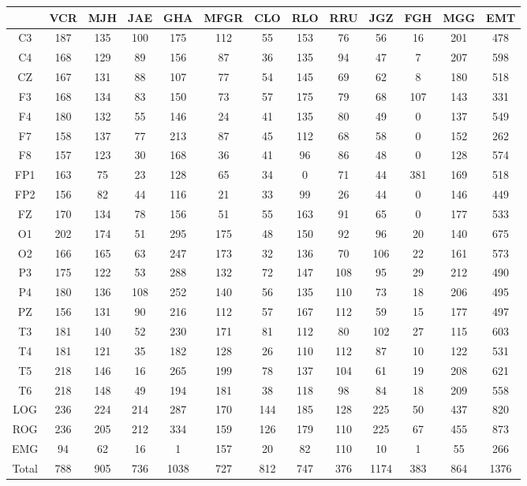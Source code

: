\begin{SidewaysFigure}
\centering
\begin{tabular}{c|ccccc|cccc|ccc}
& VCR & MJH & JAE & GHA & MFGR
& CLO & RLO & RRU & JGZ
& FGH & MGG & EMT \\
\hline
C3&187&135&100&175&112&55&153&76&56&16&201&478 \\
C4&168&129&89&156&87&36&135&94&47&7&207&598 \\
CZ&167&131&88&107&77&54&145&69&62&8&180&518 \\
F3&168&134&83&150&73&57&175&79&68&107&143&331 \\
F4&180&132&55&146&24&41&135&80&49&0&137&549 \\
F7&158&137&77&213&87&45&112&68&58&0&152&262 \\
F8&157&123&30&168&36&41&96&86&48&0&128&574 \\
FP1&163&75&23&128&65&34&0&71&44&381&169&518 \\
FP2&156&82&44&116&21&33&99&26&44&0&146&449 \\
FZ&170&134&78&156&51&55&163&91&65&0&177&533 \\
O1&202&174&51&295&175&48&150&92&96&20&140&675 \\
O2&166&165&63&247&173&32&136&70&106&22&161&573 \\
P3&175&122&53&288&132&72&147&108&95&29&212&490 \\
P4&180&136&108&252&140&56&135&110&73&18&206&495 \\
PZ&156&131&90&216&112&57&167&112&59&15&177&497 \\
T3&181&140&52&230&171&81&112&80&102&27&115&603 \\
T4&181&121&35&182&128&26&110&112&87&10&122&531 \\
T5&218&146&16&265&199&78&137&104&61&19&208&621 \\
T6&218&148&49&194&181&38&118&98&84&18&209&558 \\
LOG&236&224&214&287&170&144&185&128&225&50&437&820 \\
ROG&236&205&212&334&159&126&179&110&225&67&455&873 \\
EMG&94&62&16&1&157&20&82&110&10&1&55&266 \\
\hline
Total&788&905&736&1038&727&812&747&376&1174&383&864&1376
\end{tabular}
\caption{Total  de \'epocas PE dentro del registro pero que no fueron clasificadas
como MOR (fases W y N) para cada
canal. %
}
\label{total_gpos_nmor}
\end{SidewaysFigure}

